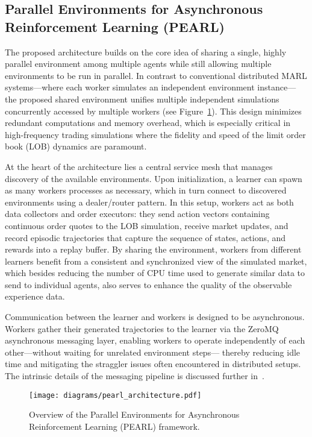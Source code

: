 \documentclass[11pt]{article}
\begin{document}
    \subsection{Parallel Environments for Asynchronous Reinforcement Learning (PEARL)}
    \label{subsec:pearl}
    The proposed architecture builds on the core idea of sharing a single, highly parallel environment among multiple agents while
    still allowing multiple environments to be run in parallel.
    In contrast to conventional distributed MARL systems—where each worker simulates an independent environment instance—
    the proposed shared environment unifies multiple independent simulations concurrently accessed by multiple workers
    (see Figure~\ref{fig:pearl_architecture}).
    This design minimizes redundant computations and memory overhead,
    which is especially critical in high-frequency trading simulations where the fidelity and speed of the limit order book (LOB) dynamics are paramount.

    At the heart of the architecture lies a central service mesh that manages discovery of the available environments.
    Upon initialization, a learner can spawn as many workers processes as necessary,
    which in turn connect to discovered environments using a dealer/router pattern.
    In this setup, workers act as both data collectors and order executors:
    they send action vectors containing continuous order quotes to the LOB simulation,
    receive market updates, and record episodic trajectories that capture the sequence of states, actions, and rewards into a replay buffer.
    By sharing the environment, workers from different learners benefit from a consistent and synchronized view of the simulated market,
    which besides reducing the number of CPU time used to generate similar data to send to individual agents,
    also serves to enhance the quality of the observable experience data.

    Communication between the learner and workers is designed to be asynchronous.
    Workers gather their generated trajectories to the learner via the ZeroMQ asynchronous messaging layer,
    enabling workers to operate independently of each other—without waiting for unrelated environment steps—
    thereby reducing idle time and mitigating the straggler issues often encountered in distributed setups.
    The intrinsic details of the messaging pipeline is discussed further in~.

    \begin{figure}[htb]
        \centering
        \texttt{[image: diagrams/pearl\_architecture.pdf]}
        \caption{Overview of the Parallel Environments for Asynchronous Reinforcement Learning (PEARL) framework.}
        \label{fig:pearl_architecture}
    \end{figure}
\end{document}
